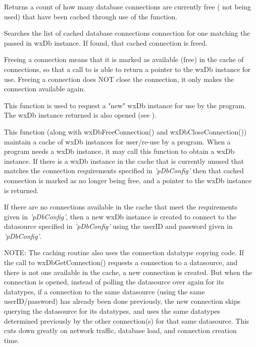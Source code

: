 

Returns a count of how many database connections are currently free ( not
being used) that have been cached through use of the 
function.




Searches the list of cached database connections connection for one matching
the passed in wxDb instance.  If found, that cached connection is freed.

Freeing a connection means that it is marked as available (free) in the
cache of connections, so that a call to 
is able to return a pointer to the wxDb instance for use.  Freeing a
connection does NOT close the connection, it only makes the connection
available again.




This function is used to request a "new" wxDb instance for use by the program.
The wxDb instance returned is also opened (see ).

This function (along with wxDbFreeConnection() and wxDbCloseConnection())
maintain a cache of wxDb instances for user/re-use by a program.  When a
program needs a wxDb instance, it may call this function to obtain a wxDb
instance.  If there is a wxDb instance in the cache that is currently unused
that matches the connection requirements specified in {\it'pDbConfig'} then
that cached connection is marked as no longer being free, and a pointer to
the wxDb instance is returned.

If there are no connections available in the cache that meet the requirements
given in {\it'pDbConfig'}, then a new wxDb instance is created to connect
to the datasource specified in {\it'pDbConfig'} using the userID and password
given in {\it'pDbConfig'}.

NOTE: The caching routine also uses the 
connection datatype copying code.  If the call to wxDbGetConnection()
requests a connection to a datasource, and there is not one available in the
cache, a new connection is created.  But when the connection is opened,
instead of polling the datasource over again for its datatypes, if a
connection to the same datasource (using the same userID/password) has already
been done previously, the new connection skips querying the datasource for
its datatypes, and uses the same datatypes determined previously by the
other connection(s) for that same datasource.  This cuts down greatly on
network traffic, database load, and connection creation time.

